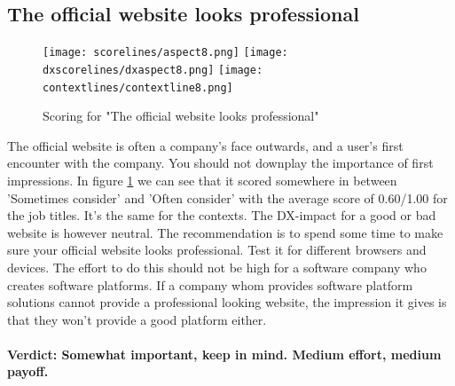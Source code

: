 \documentclass{cslthse-msc}
\begin{document}
    \subsection{The official website looks professional}
    \begin{figure}[H]
        \centering
        \texttt{[image: scorelines/aspect8.png]}
        \texttt{[image: dxscorelines/dxaspect8.png]}
        \texttt{[image: contextlines/contextline8.png]}
        \caption{Scoring for "The official website looks professional"}
        \label{fig:aspect8}
    \end{figure}
    The official website is often a company's face outwards, and a user's first encounter with the company. You should not downplay the importance of first impressions. In figure \ref{fig:aspect8} we can see that it scored somewhere in between 'Sometimes consider' and 'Often consider' with the average score of 0.60/1.00 for the job titles. It's the same for the contexts. The DX-impact for a good or bad website is however neutral. The recommendation is to spend some time to make sure your official website looks professional. Test it for different browsers and devices. The effort to do this should not be high for a software company who creates software platforms. If a company whom provides software platform solutions cannot provide a professional looking website, the impression it gives is that they won't provide a good platform either.
    \\ \\
    \textbf{Verdict: Somewhat important, keep in mind. Medium effort, medium payoff.}
\end{document}
